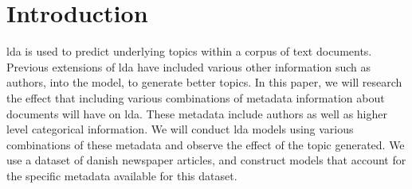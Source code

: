 \section{Introduction}\label{sec:intro}
\gls{lda} is used to predict underlying topics within a corpus of text documents.
Previous extensions of \gls{lda} have included various other information such as authors, into the model, to generate better topics.
In this paper, we will research the effect that including various combinations of metadata information about documents will have on \gls{lda}.
These metadata include authors as well as higher level categorical information.
We will conduct \gls{lda} models using various combinations of these metadata and observe the effect of the topic generated.
We use a dataset of danish newspaper articles, and construct models that account for the specific metadata available for this dataset.